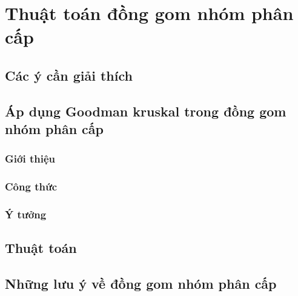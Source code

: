 \section{Thuật toán đồng gom nhóm phân cấp}
	\subsection{Các ý cần giải thích}
	
	\subsection{Áp dụng Goodman kruskal trong đồng gom nhóm phân cấp}
	
		\subsubsection{Giới thiệu}		
		
		\subsubsection{Công thức}
		
		\subsubsection{Ý tưởng}
	\subsection{Thuật toán}
	
	\subsection{Những lưu ý về đồng gom nhóm phân cấp}
		
